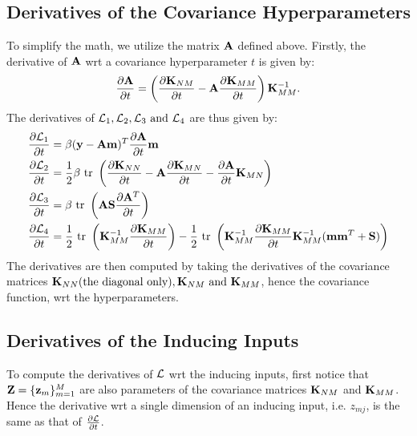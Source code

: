 \subsection{Derivatives of the Covariance Hyperparameters}  
To simplify the math, we utilize the matrix $\mathbf{A}$ defined above.
Firstly, the derivative of $\mathbf{A}$ wrt a covariance hyperparameter $t$ is given by:
\begin{align}
\frac{\partial{\mathbf{A}}}{\partial{t}} = \left(\frac{\partial{\mathbf{K}_{NM}}}{\partial{t}} - \mathbf{A} \frac{\partial{\mathbf{K}_{MM}}}{\partial{t}}\right)\mathbf{K}_{MM}^{-1}.
\end{align}
The derivatives of $\mathcal{L}_1, \mathcal{L}_2, \mathcal{L}_3 \text{ and } \mathcal{L}_4$ are thus given by:
\begin{align}
\frac{\partial{\mathcal{L}_1}}{\partial{t}} &= \beta (\mathbf{y} - \mathbf{A}\mathbf{m})^T \frac{\partial{\mathbf{A}}}{\partial{t}} \mathbf{m} \\
\frac{\partial{\mathcal{L}_2}}{\partial{t}} &= \frac{1}{2}\beta \mbox{ \rm tr } \left(\frac{\partial{\mathbf{K}_{NN}}}{\partial{t}} - \mathbf{A} \frac{\partial{\mathbf{K}_{MN}}}{\partial{t}} - \frac{\partial{\mathbf{A}}}{\partial{t}} \mathbf{K}_{MN}\right) \\
\frac{\partial{\mathcal{L}_3}}{\partial{t}} &= \beta \mbox{ \rm tr } \left(\mathbf{A} \mathbf{S} \frac{\partial{\mathbf{A}^T}}{\partial{t}} \right) \\
\frac{\partial{\mathcal{L}_4}}{\partial{t}} &= \frac{1}{2}  \mbox{ \rm tr } \left(\mathbf{K}_{MM}^{-1} \frac{\partial{ \mathbf{K}_{MM}}}{\partial{t}}\right) - \frac{1}{2} \mbox{ \rm tr } \left(\mathbf{K}_{MM}^{-1} \frac{\partial{\mathbf{K}_{MM}}}{\partial{t}} \mathbf{K}_{MM}^{-1} (\mathbf{m} \mathbf{m}^T + \mathbf{S}) \right) 
\end{align}
The derivatives are then computed by taking the derivatives of the covariance matrices $\mathbf{K}_{NN} (\text{the diagonal only}), \mathbf{K}_{NM} \text{ and }  \mathbf{K}_{MM}$, hence the covariance function, wrt the hyperparameters. 

\subsection{Derivatives of the Inducing Inputs}
To compute the derivatives of $\mathcal{L}$ wrt the inducing inputs, first notice that $\mathbf{Z} = \{\mathbf{z}_m\}_{m=1}^M$ are also parameters of the covariance matrices $\mathbf{K}_{NM}$ and $\mathbf{K}_{MM}$.
Hence the derivative wrt a single dimension of an inducing input, i.e. $z_{mj}$, is the same as that of $\frac{\partial{ \mathcal{L}}}{\partial{t}}$.

